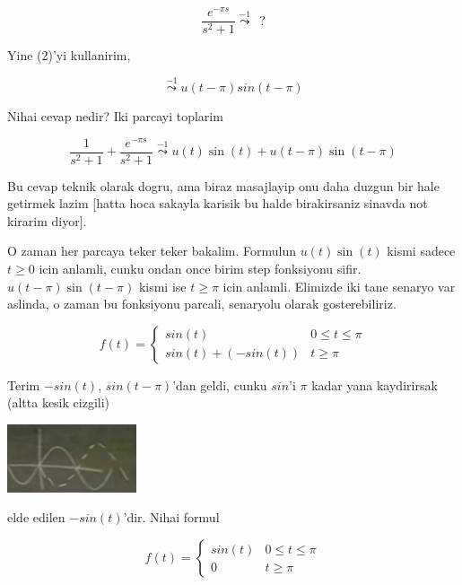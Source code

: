 \documentclass[12pt,fleqn]{article}\usepackage{../common}
\begin{document}
\[ \frac{e^{-\pi s}}{s^2 + 1} \stackrel{-1}{\leadsto} \ \ ? \]

Yine (2)'yi kullanirim, 

\[\stackrel{-1}{\leadsto} u(t-\pi)sin(t-\pi) \]

Nihai cevap nedir? Iki parcayi toplarim

\[ \frac{1}{s^2+1} + \frac{e^{-\pi s}}{s^2 + 1} \stackrel{-1}{\leadsto} 
u(t)\sin(t) + u(t-\pi)\sin(t-\pi) 
\]

Bu cevap teknik olarak dogru, ama biraz masajlayip onu daha duzgun bir hale
getirmek lazim [hatta hoca sakayla karisik bu halde birakirsaniz sinavda
not kirarim diyor]. 

O zaman her parcaya teker teker bakalim. Formulun $u(t)\sin(t)$ kismi
sadece $t \ge 0$ icin anlamli, cunku ondan once birim step fonksiyonu
sifir. $u(t-\pi)\sin(t-\pi) $ kismi ise $t \ge \pi$ icin anlamli. Elimizde
iki tane senaryo var aslinda, o zaman bu fonksiyonu parcali, senaryolu
olarak gosterebiliriz. 

\[ 
f(t) = 
\left\{ \begin{array}{ll}
sin(t) & 0 \le t \le \pi \\
sin(t) + (-sin(t)) & t \ge \pi
\end{array} \right.
 \]

Terim $-sin(t)$, $sin(t-\pi)$'dan geldi, cunku $sin$'i $\pi$ kadar yana
kaydirirsak (altta kesik cizgili) 

\includegraphics[height=2cm]{22_10.png}

elde edilen $-sin(t)$'dir. Nihai formul

\[ 
f(t) = 
\left\{ \begin{array}{ll}
sin(t) & 0 \le t \le \pi \\
0 & t \ge \pi
\end{array} \right.
 \]
\end{document}
